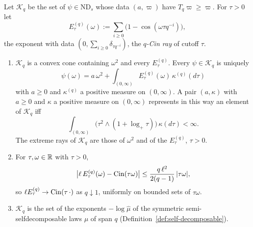 \begin{proposition}
\label{prop:strata-cylinder-coordinates-q-cin}

Let $\mathcal{K}_q$ be the set of $\psi \in \mathrm{ND}_s$ whose data $(a, \varpi)$ have
$T_q\varpi \ge \varpi$. For $\tau > 0$ let
\[
  E^{(q)}_\tau(\omega) := \sum_{i \ge 0}\bigl(1 - \cos(\omega\tau q^{-i})\bigr),
\]
the exponent with data $(0, \sum_{i \ge 0}\delta_{\tau q^{-i}})$, the \emph{$q$-Cin ray} of
cutoff $\tau$.
\begin{enumerate}
\item $\mathcal{K}_q$ is a convex cone containing $\omega^2$ and every $E^{(q)}_\tau$. Every
$\psi \in \mathcal{K}_q$ is uniquely
\[
  \psi(\omega) = a\,\omega^2 + \int_{(0,\infty)}E^{(q)}_\tau(\omega)\,\kappa^{(q)}(d\tau)
\]
with $a \ge 0$ and $\kappa^{(q)}$ a positive measure on $(0,\infty)$. A pair $(a, \kappa)$ with
$a \ge 0$ and $\kappa$ a positive measure on $(0,\infty)$ represents in this way an element of
$\mathcal{K}_q$ iff
\[
  \int_{(0,\infty)}\bigl(\tau^2 \wedge (1 + \log_+\tau)\bigr)\,\kappa(d\tau) < \infty .
\]
The extreme rays of $\mathcal{K}_q$ are those of $\omega^2$ and of the $E^{(q)}_\tau$, $\tau > 0$.
\item For $\tau, \omega \in \mathbb{R}$ with $\tau > 0$,
\[
  \bigl|\ell\,E^{(q)}_\tau(\omega) - \operatorname{Cin}(\tau\omega)\bigr| \le \frac{q\,\ell^2}{2(q - 1)}\,|\tau\omega|,
\]
so $\ell E^{(q)}_\tau \to \operatorname{Cin}(\tau\,\cdot)$ as $q \downarrow 1$, uniformly on bounded sets of
$\tau\omega$.
\item $\mathcal{K}_q$ is the set of the exponents $-\log\widehat\mu$ of the symmetric
semi-selfdecomposable laws $\mu$ of span $q$ (Definition~\ref{def:self-decomposable}).
\end{enumerate}
\end{proposition}

